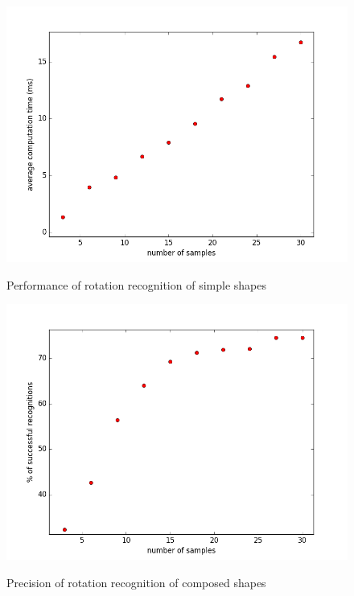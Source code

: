 \begin{description}
\begin{figure}[!htb]
\begin{center}
\label{fig:rotation_simple_speed}
\includegraphics[width=\linewidth]{ext/rotation_simple_speed.png}
\end{center}
    \centering
    \caption{Performance of rotation recognition of simple shapes}
\end{figure}

\begin{figure}[!htb]
\begin{center}
\label{fig:rotation_comp_precision}
\includegraphics[width=\linewidth]{ext/rotation_comp_precision.png}
\end{center}
    \centering
    \caption{Precision of rotation recognition of composed shapes}
\end{figure}


\end{description}
